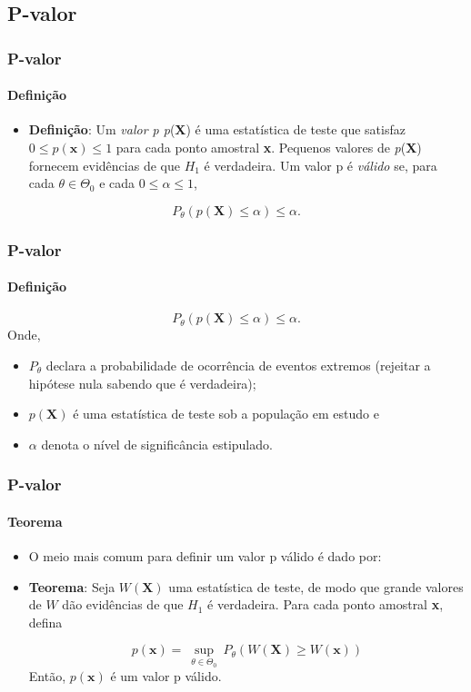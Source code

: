 \begin{frame}[c]
\section{P-valor}
\frametitle{P-valor} 
\framesubtitle{Definição}
\begin{itemize}
    \justifying
    \item \textbf{Definição}: Um \textit{valor p p}(\textbf{X}) é uma estatística de teste que satisfaz $0 \leq p(\textbf{x}) \leq 1$ para cada ponto amostral \textbf{x}. Pequenos valores de \textit{p}(\textbf{X}) fornecem evidências de que $H_{1}$ é verdadeira. Um valor p é \textit{válido} se, para cada $\theta \in \Theta_{0}$ e cada $0 \leq \alpha \leq 1$,
\end{itemize}

\begin{equation}
     P_{ \theta } (p(\textbf{X})  \leq  \alpha ) \leq  \alpha.
\end{equation}
\end{frame}

\begin{frame}[c] 
\frametitle{P-valor} 
\framesubtitle{Definição}
\begin{equation}
     P_{ \theta } (p(\textbf{X})  \leq  \alpha ) \leq  \alpha.
\end{equation}
Onde,
\begin{itemize}
    \item $P_{ \theta }$ declara a probabilidade de ocorrência de eventos extremos (rejeitar a hipótese nula sabendo que é verdadeira);
    \item $p(\textbf{X})$ é uma estatística de teste sob a população em estudo e
    \item $\alpha$ denota o nível de significância estipulado.
\end{itemize}
\end{frame}

\begin{frame}[c] 
\frametitle{P-valor} 
\framesubtitle{Teorema}
\begin{itemize}
    \justifying
    \item O meio mais comum para definir um valor p válido é dado por:
    \item \textbf{Teorema}: Seja $W(\textbf{X})$ uma estatística de teste, de modo que grande valores de $W$ dão evidências de que $H_1$ é verdadeira. Para cada ponto amostral \textbf{x}, defina

\begin{equation}
    p(\textbf{x}) = \ \sup_{\theta \in \Theta_{0}} \ P_{\theta}(W(\textbf{X}) \geq W(\textbf{x}))
\end{equation}
    Então, $p(\textbf{x})$ é um valor p válido.
\end{itemize}
\end{frame}

